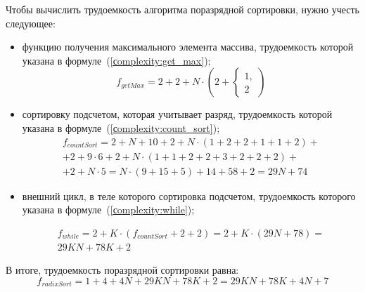 Чтобы вычислить трудоемкость алгоритма поразрядной сортировки, нужно учесть следующее:

\begin{itemize}[label=---]
	
	\item функцию получения максимального элемента массива, трудоемкость которой указана в формуле~(\ref{сomplexity:get_max});
	\begin{equation}
		\label{сomplexity:get_max}
		f_{getMax} = 2 + 2 + N \cdot (2 + 
		\begin{cases}
			1, \\
			2
		\end{cases}
		)
	\end{equation}

	\item сортировку подсчетом, которая учитывает разряд, трудоемкость которой указана в формуле~(\ref{сomplexity:count_sort});
	\begin{equation}
		\label{сomplexity:count_sort}
		\begin{gathered}
			f_{countSort} = 2 + N + 10 + 2 + N \cdot (1 + 2 + 2 + 1 + 1 + 2) +\\
			+ 2 + 9 \cdot 6 + 2 + N \cdot (1 + 1 + 2 + 2 + 3 + 2 + 2 + 2) + \\
			+ 2 + N \cdot 5 = N \cdot (9 + 15 + 5) + 14 + 58 + 2 = 29N + 74
		\end{gathered}
	\end{equation}

	\item внешний цикл, в теле которого сортировка подсчетом, трудоемкость которого указана в формуле~(\ref{сomplexity:while});
	
	\begin{equation}
		\label{сomplexity:while}
		\begin{gathered}
			f_{while} = 2 + K \cdot (f_{countSort} + 2 + 2) = 2 + K \cdot (29N + 78) = \\
			29KN + 78K + 2
		\end{gathered}
	\end{equation}
\end{itemize}


В итоге, трудоемкость поразрядной сортировки равна:
\begin{equation}
	\label{complexity:radixSort}
	f_{radixSort} = 1 + 4 + 4N + 29KN + 78K + 2 = 29KN + 78K + 4N + 7
\end{equation}

